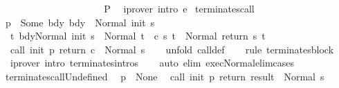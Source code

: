 \begin{isabellebody}
\ \ \ \ \ \ \ \ \isamarkupfalse%
\isanewline
\ \ \ \ \isamarkupfalse%
\isanewline
\ \ \isacommand{{\isacharbraceright}}\isamarkupfalse%
\isanewline
\ \ \isamarkupfalse%
\ \isamarkupfalse%
\ P\ \isamarkupfalse%
\ {\isacharparenleft}iprover\ intro{\isacharcolon}\ e{\isacharparenright}\isanewline
{}\isamarkupfalse%
%
\endisatagproof
{\isafoldproof}%
%
\isadelimproof
\isanewline
%
\endisadelimproof
\isanewline
\isanewline
{}\isamarkupfalse%
\ terminates{\isacharunderscore}call{\isacharcolon}\ \isanewline
{\isachardoublequoteopen}{\isasymlbrakk}{\isasymGamma}\ p\ {\isacharequal}\ Some\ bdy{\isacharsemicolon}\ {\isasymGamma}{\isasymturnstile}bdy\ {\isasymdown}\ Normal\ {\isacharparenleft}init\ s{\isacharparenright}{\isacharsemicolon}\isanewline
\ \ {\isasymforall}t{\isachardot}\ {\isasymGamma}{\isasymturnstile}{\isasymlangle}bdy{\isacharcomma}Normal\ {\isacharparenleft}init\ s{\isacharparenright}{\isasymrangle}\ {\isasymRightarrow}\ Normal\ t\ {\isasymlongrightarrow}\ {\isasymGamma}{\isasymturnstile}c\ s\ t\ {\isasymdown}\ Normal\ {\isacharparenleft}return\ s\ t{\isacharparenright}{\isasymrbrakk}\isanewline
\ {\isasymLongrightarrow}\ {\isasymGamma}{\isasymturnstile}call\ init\ p\ return\ c\ {\isasymdown}\ Normal\ s{\isachardoublequoteclose}\isanewline
%
\isadelimproof
\ \ %
\endisadelimproof
%
\isatagproof
{}\isamarkupfalse%
\ {\isacharparenleft}unfold\ call{\isacharunderscore}def{\isacharparenright}\isanewline
\ \ \isamarkupfalse%
\ {\isacharparenleft}rule\ terminates{\isacharunderscore}block{\isacharparenright}\isanewline
\ \ \isamarkupfalse%
\ \ {\isacharparenleft}iprover\ intro{\isacharcolon}\ terminates{\isachardot}intros{\isacharparenright}\isanewline
\ \ \isamarkupfalse%
\ {\isacharparenleft}auto\ elim{\isacharcolon}\ exec{\isacharunderscore}Normal{\isacharunderscore}elim{\isacharunderscore}cases{\isacharparenright}\isanewline
\ \ \isamarkupfalse%
%
\endisatagproof
{\isafoldproof}%
%
\isadelimproof
\isanewline
%
\endisadelimproof
\isanewline
{}\isamarkupfalse%
\ terminates{\isacharunderscore}callUndefined{\isacharcolon}\ \isanewline
{\isachardoublequoteopen}{\isasymlbrakk}{\isasymGamma}\ p\ {\isacharequal}\ None{\isasymrbrakk}\isanewline
\ {\isasymLongrightarrow}\ {\isasymGamma}{\isasymturnstile}call\ init\ p\ return\ result\ {\isasymdown}\ Normal\ s{\isachardoublequoteclose}\isanewline
%
\isadelimproof
\ \ %
\endisadelimproof
%
\isatagproof

\end{isabellebody}
